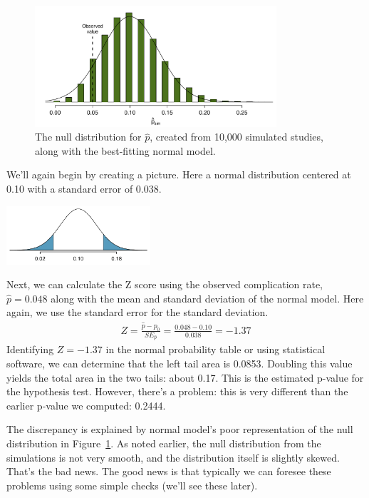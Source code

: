 \begin{figure}
\centering
\includegraphics[width=0.8\textwidth]{02/figures/MedicalConsultant/MedConsNullSim_w_normal}
\caption{The null distribution for $\hat{p}$, created from 10,000 simulated studies, along with the best-fitting normal model.}
\label{MedConsNullSim_w_normal}
\end{figure}

We'll again begin by creating a picture. Here a normal distribution centered at 0.10 with a standard error of 0.038.
\begin{center}
\includegraphics[width=0.4\textwidth]{02/figures/MedicalConsultant/MedConsNullSim_normal_only}
\end{center}
Next, we can calculate the Z score using the observed complication rate, $\hat{p} = 0.048$ along with the mean and standard deviation of the normal model. Here again, we use the standard error for the standard deviation.
\begin{align*}
Z = \frac{\hat{p} - p_0}{SE_{\hat{p}}} = \frac{0.048 - 0.10}{0.038} = -1.37
\end{align*}
Identifying $Z = -1.37$ in the normal probability table or using statistical software, we can determine that the left tail area is 0.0853. Doubling this value yields the total area in the two tails: about 0.17. This is the estimated p-value for the hypothesis test. However, there's a problem: this is very different than the earlier p-value we computed: 0.2444.

The discrepancy is explained by normal model's poor representation of the null distribution in Figure~\ref{MedConsNullSim_w_normal}. As noted earlier, the null distribution from the simulations is not very smooth, and the distribution itself is slightly skewed. That's the bad news. The good news is that typically we can foresee these problems using some simple checks (we'll see these later).

